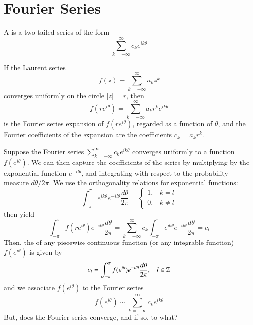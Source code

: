 \section{Fourier Series}

\begin{definition}
    A  is a two-tailed series of the form \begin{equation}
        \sum_{k=-\infty}^{\infty}c_ke^{ik\theta}
    \end{equation}
\end{definition}

If the Laurent series \begin{equation*}
    f(z) = \sum_{k=-\infty}^{\infty}a_kz^k
\end{equation*}
converges uniformly on the circle $|z| = r$, then \begin{equation*}
    f(re^{i\theta}) = \sum_{k=-\infty}^{\infty}a_kr^ke^{ik\theta}
\end{equation*}
is the Fourier series expansion of $f(re^{i\theta})$, regarded as a function of $\theta$, and the Fourier coefficients of the expansion are the coefficients $c_k = a_kr^k$.

\begin{remark}
    Suppose the Fourier series $\sum_{k=-\infty}^{\infty}c_ke^{ik\theta}$ converges uniformly to a function $f(e^{i\theta})$. We can then capture the coefficients of the series by multiplying by the exponential function $e^{-il\theta}$, and integrating with respect to the probability measure $d\theta/2\pi$. We use the orthogonality relations for exponential functions: \begin{equation*}
        \int_{-\pi}^{\pi}e^{ik\theta}e^{-il\theta}\frac{d\theta}{2\pi} = \left\{\begin{array}{lc} 1, & k = l \\ 0, & k \neq l \end{array}\right.
    \end{equation*}
    then yield \begin{equation*}
        \int_{-\pi}^{\pi}f(re^{i\theta})e^{-il\theta}\frac{d\theta}{2\pi} = \sum_{k=-\infty}^{\infty}c_k\int_{-\pi}^{\pi}e^{ik\theta}e^{-il\theta}\frac{d\theta}{2\pi} = c_l
    \end{equation*}
    Then, the  of any piecewise continuous function (or any integrable function) $f(e^{i\theta})$ is given by \begin{equation*}
        c_l = \int_{-\pi}^{\pi}f(e^{i\theta})e^{-il\theta}\frac{d\theta}{2\pi},\;\;\;l\in\mathbb Z
    \end{equation*}
    and we associate $f(e^{i\theta})$ to the Fourier series \begin{equation*}
        f(e^{i\theta}) \sim \sum_{k=-\infty}^{\infty}c_ke^{ik\theta}
    \end{equation*}
    But, does the Fourier series converge, and if so, to what?
\end{remark}


